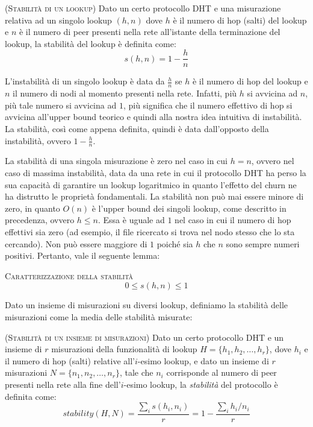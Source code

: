 \documentclass[prodmode,acmtap]{acmlarge}
\begin{document}
\begin{definition}{(\textsc{Stabilità di un lookup})} \label{eq:stab}
Dato un certo protocollo DHT e una misurazione relativa ad un singolo lookup $(h,n)$ dove $h$ è il numero di hop (salti) del lookup e $n$ è il numero di peer presenti nella rete all'istante della terminazione del lookup, la stabilità del lookup è definita come:
$$ s(h,n) = 1 - \frac{h}{n} $$
\end{definition}

L'instabilità di un singolo lookup è data da $\frac{h}{n}$ se $h$ è il numero di hop del lookup e $n$ il numero di nodi al momento presenti nella rete. Infatti, più $h$ si avvicina ad $n$, più tale numero si avvicina ad $1$, più significa che il numero effettivo di hop si avvicina all'upper bound teorico e quindi alla nostra idea intuitiva di instabilità. La stabilità, così come appena definita, quindi è data dall'opposto della instabilità, ovvero $1 - \frac{h}{n}$.

La stabilità di una singola misurazione è zero nel caso in cui $h=n$, ovvero nel caso di massima instabilità, data da una rete in cui il protocollo DHT ha perso la sua capacità di garantire un lookup logaritmico in quanto l'effetto del churn ne ha distrutto le proprietà fondamentali. La stabilità non può mai essere minore di zero, in quanto $O(n)$ è l'upper bound dei singoli lookup, come descritto in precedenza, ovvero $h \leq n$. Essa è uguale ad $1$ nel caso in cui il numero di hop effettivi sia zero (ad esempio, il file ricercato si trova nel nodo stesso che lo sta cercando). Non può essere maggiore di $1$ poiché sia $h$ che $n$ sono sempre numeri positivi. Pertanto, vale il seguente lemma:

\begin{lemma}{\textsc{Caratterizzazione della stabilità}}
$$ 0 \leq s(h,n) \leq 1 $$
\end{lemma}

Dato un insieme di misurazioni su diversi lookup, definiamo la stabilità delle misurazioni come la media delle stabilità misurate:

\begin{definition}{(\textsc{Stabilità di un insieme di misurazioni})}
Dato un certo protocollo DHT e un insieme di $r$ misurazioni della funzionalità di lookup ${H=\{ h_1, h_2, \dots, h_r \}}$, dove $h_i$ e il numero di hop (salti) relative all'$i$-esimo lookup, e dato un insieme di $r$ misurazioni ${N=\{ n_1, n_2, \dots, n_r \}}$, tale che $n_i$ corrisponde al numero di peer presenti nella rete alla fine dell'$i$-esimo lookup, la \emph{stabilità} del protocollo è definita come:
$$ stability(H,N) = \frac{\sum_{i} s(h_i,n_i)}{r}  = 1 - \frac{\sum_{i}^{}h_i/n_i}{r} $$
\end{definition}
\end{document}

